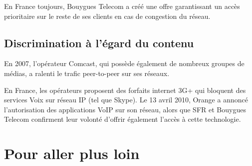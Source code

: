 \documentclass[12pt]{../fiche}
\begin{document}
En France toujours, Bouygues Telecom a créé une offre garantissant un
accès \og{}prioritaire\fg{} sur le reste de ses clients en cas de congestion
du réseau.

\subsection{Discrimination à l'égard du
contenu}\label{discrimination-uxe0-luxe9gard-du-contenu}

En 2007, l'opérateur Comcast, qui possède également de nombreux groupes
de médias, a ralenti le trafic peer-to-peer sur ses réseaux.

En France, les opérateurs proposent des forfaits internet 3G+ qui
bloquent des services Voix sur réseau IP (tel que Skype). Le 13 avril
2010, Orange a annoncé l'autorisation des applications VoIP sur son
réseau, alors que SFR et Bouygues Telecom confirment leur volonté
d'offrir également l'accès à cette technologie.

\section{Pour aller plus loin}\label{pour-aller-plus-loin}
\end{document}
